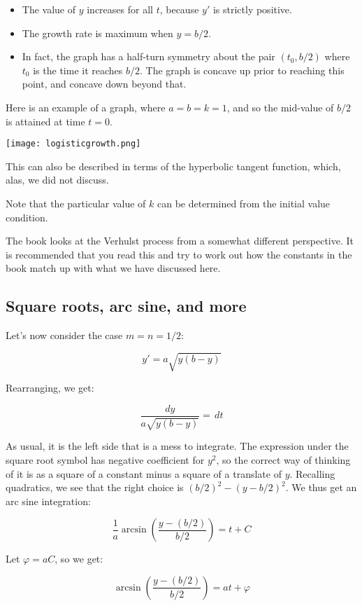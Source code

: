 \documentclass{amsart}
\begin{document}
\begin{itemize}
\item The value of $y$ increases for all $t$, because $y'$ is strictly
  positive.
\item The growth rate is maximum when $y = b/2$.
\item In fact, the graph has a half-turn symmetry about the pair
  $(t_0,b/2)$ where $t_0$ is the time it reaches $b/2$. The graph is
  concave up prior to reaching this point, and concave down beyond
  that.
\end{itemize}

Here is an example of a graph, where $a = b = k = 1$, and so the
mid-value of $b/2$ is attained at time $t = 0$.

\texttt{[image: logisticgrowth.png]}

This can also be described in terms of the hyperbolic tangent
function, which, alas, we did not discuss.

Note that the particular value of $k$ can be determined from the
initial value condition.

The book looks at the Verhulst process from a somewhat different
perspective. It is recommended that you read this and try to work out
how the constants in the book match up with what we have discussed
here.

\subsection{Square roots, arc sine, and more}

Let's now consider the case $m = n = 1/2$:

$$y' = a\sqrt{y(b - y)}$$

Rearranging, we get:

$$\frac{dy}{a\sqrt{y(b - y)}} = \, dt$$

As usual, it is the left side that is a mess to integrate. The
expression under the square root symbol has negative coefficient for
$y^2$, so the correct way of thinking of it is as a square of a
constant minus a square of a translate of $y$. Recalling quadratics,
we see that the right choice is $(b/2)^2 - (y - b/2)^2$. We thus get
an arc sine integration:

$$\frac{1}{a}\arcsin\left(\frac{y - (b/2)}{b/2}\right) = t + C$$

Let $\varphi = aC$, so we get:

$$\arcsin\left(\frac{y - (b/2)}{b/2}\right) = at + \varphi$$
\end{document}
